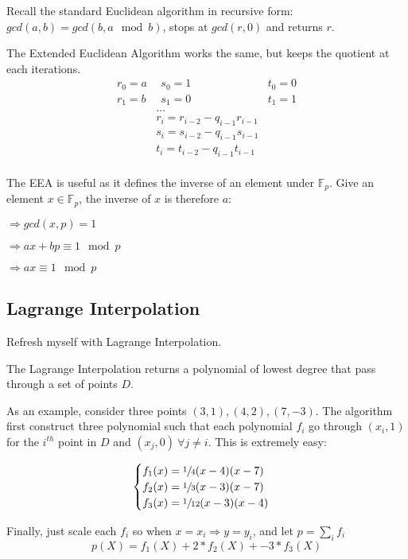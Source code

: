 \documentclass[10pt]{article}
\newcommand{\FField}{\mathbb{F}_p}
\begin{document}
Recall the standard Euclidean algorithm in recursive form: $gcd(a, b) = gcd(b,
a \mod b)$, stops at $gcd(r, 0)$ and returns $r$. 

The Extended Euclidean Algorithm works the same, but keeps the quotient at
each iterations.
$$
\begin{aligned}
    r_0 = a & \ \  s_0 = 1 & t_0 = 0\\
    r_1 = b & \ \  s_1 = 0 & t_1 = 1\\
            & \ldots &  \\
           & r_i = r_{i-2} - q_{i-1} r_{i-1} \\
           & s_i = s_{i-2} - q_{i-1} s_{i-1}  \\
           & t_i = t_{i-2} - q_{i-1} t_{i-1}\\
\end{aligned}
$$

The EEA is useful as it defines the inverse of an element under $\FField$.
Give an element $x \in \FField$, the inverse of $x$ is therefore $a$:
\begin{description}
    \item $\Rightarrow gcd(x, p) = 1$
    \item $\Rightarrow ax + bp \equiv 1 \mod p$
    \item $\Rightarrow ax \equiv 1 \mod p$
\end{description}

\subsection{Lagrange Interpolation}
Refresh myself with Lagrange Interpolation.

The Lagrange Interpolation returns a polynomial of lowest degree that pass
through a set of points $D$.

As an example, consider three points $(3, 1), (4, 2), (7, -3)$. The algorithm
first construct three polynomial such that each polynomial $f_i$ go through $(x_i,
1)$ for the $i^{th}$ point in $D$ and $(x_j, 0)\ \forall j \neq i$.
This is extremely easy:

$$
\begin{cases}
    f_1(x) = \sfrac{1}{4}(x-4)(x-7) \\
    f_2(x) = \sfrac{1}{3}(x-3)(x-7) \\
    f_3(x) = \sfrac{1}{12}(x-3)(x-4) \\
\end{cases}
$$


Finally, just scale each $f_i$ so when $x = x_i \Longrightarrow y = y_i$, and let $p =
\sum_{i}f_i$
$$
p(X) = f_1(X) + 2 * f_2(X) + -3 * f_3(X)
$$
\end{document}
